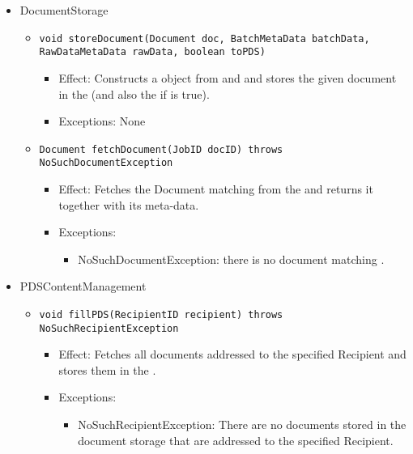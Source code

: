 \begin{itemize}
    \item DocumentStorage
	\begin{itemize}
		\item \texttt{void storeDocument(Document doc, BatchMetaData batchData, RawDataMetaData rawData, boolean toPDS)}
		\begin{itemize}
			\item Effect: Constructs a  object from  and  and stores the given document in the  (and also the  if  is true).
			\item Exceptions: None
		\end{itemize}
		
		\item \texttt{Document fetchDocument(JobID docID) throws NoSuchDocumentException}
		\begin{itemize}
			\item Effect: Fetches the Document matching  from the  and returns it together with its meta-data.
			\item Exceptions: 
			\begin{itemize}
				\item NoSuchDocumentException: there is no document matching .
			\end{itemize}
		\end{itemize}
	\end{itemize}

	\item PDSContentManagement
	\begin{itemize}
		\item \texttt{void fillPDS(RecipientID recipient) throws NoSuchRecipientException}
		\begin{itemize}
			\item Effect: Fetches all documents addressed to the specified Recipient and stores them in the .
			\item Exceptions:
			\begin{itemize}
				\item NoSuchRecipientException: There are no documents stored in the document storage that are addressed to the specified Recipient.
			\end{itemize}
		\end{itemize}
				

\end{itemize}
\end{itemize}
